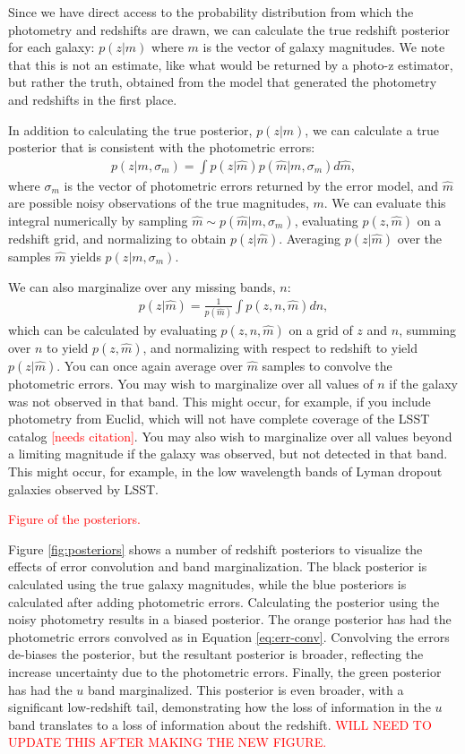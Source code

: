 \documentclass[twocolumn]{aastex631}
\newcommand{\note}[1]{\textsf{\textcolor{red}{#1}}}
\newcommand{\needscite}{\note{[needs citation]}}
\begin{document}
Since we have direct access to the probability distribution from which the photometry and redshifts are drawn, we can calculate the true redshift posterior for each galaxy: $p(z|m)$ where $m$ is the vector of galaxy magnitudes.
We note that this is not an estimate, like what would be returned by a photo-z estimator, but rather the truth, obtained from the model that generated the photometry and redshifts in the first place.

In addition to calculating the true posterior, $p(z|m)$, we can calculate a true posterior that is consistent with the photometric errors:
\begin{align}
    p(z|m, \sigma_m) = \int p(z|\hat{m}) p(\hat{m}|m, \sigma_m) d\hat{m},
    \label{eq:err-conv}
\end{align}
where $\sigma_m$ is the vector of photometric errors returned by the error model, and $\hat{m}$ are possible noisy observations of the true magnitudes, $m$.
We can evaluate this integral numerically by sampling $\hat{m} \sim p(\hat{m}|m, \sigma_m)$, evaluating $p(z, \hat{m})$ on a redshift grid, and normalizing to obtain $p(z|\hat{m})$.
Averaging $p(z|\hat{m})$ over the samples $\hat{m}$ yields $p(z|m, \sigma_m)$.

We can also marginalize over any missing bands, $n$:
\begin{align}
    p(z|\hat{m}) = \frac{1}{p(\hat{m})} \int p(z, n, \hat{m}) dn,
\end{align}
which can be calculated by evaluating $p(z, n, \hat{m})$ on a grid of $z$ and $n$, summing over $n$ to yield $p(z, \hat{m})$, and normalizing with respect to redshift to yield $p(z|\hat{m})$.
You can once again average over $\hat{m}$ samples to convolve the photometric errors.
You may wish to marginalize over all values of $n$ if the galaxy was not observed in that band.
This might occur, for example, if you include photometry from Euclid, which will not have complete coverage of the LSST catalog \needscite.
You may also wish to marginalize over all values beyond a limiting magnitude if the galaxy was observed, but not detected in that band.
This might occur, for example, in the low wavelength bands of Lyman dropout galaxies observed by LSST.

\note{Figure of the posteriors.}

Figure \ref{fig:posteriors} shows a number of redshift posteriors to visualize the effects of error convolution and band marginalization.
The black posterior is calculated using the true galaxy magnitudes, while the blue posteriors is calculated after adding photometric errors.
Calculating the posterior using the noisy photometry results in a biased posterior.
The orange posterior has had the photometric errors convolved as in Equation \ref{eq:err-conv}.
Convolving the errors de-biases the posterior, but the resultant posterior is broader, reflecting the increase uncertainty due to the photometric errors.
Finally, the green posterior has had the $u$ band marginalized.
This posterior is even broader, with a significant low-redshift tail, demonstrating how the loss of information in the $u$ band translates to a loss of information about the redshift.
\note{WILL NEED TO UPDATE THIS AFTER MAKING THE NEW FIGURE.}
\end{document}
